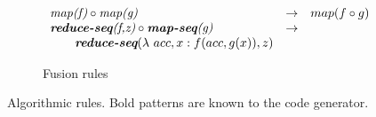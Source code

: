 \begin{figure}[t]
\vspace{\ruleSpace}
\begin{subfigure}[b]{1\linewidth}
\begin{mdframed}
$$
\begin{array}{lll}
\pat{map(f)} \circ \pat{map(g)}                                & \rightarrow & map(f \circ g)\\
\pat{\textbf{reduce-seq}(f,z)} \circ \pat{\textbf{map-seq}(g)} & \rightarrow & \\
{\hspace{2em}} \pat{\textbf{reduce-seq}}(\lambda\ acc,x: f(acc,g(x)), z)\\  %
\end{array}
$$
\end{mdframed}
  \caption{Fusion rules}
   \label{fig:algo:fusion}
\end{subfigure}
\vspace{-2em}
\caption{Algorithmic rules. Bold patterns are known to the code generator.}
\label{fig:algo}
\end{figure}



